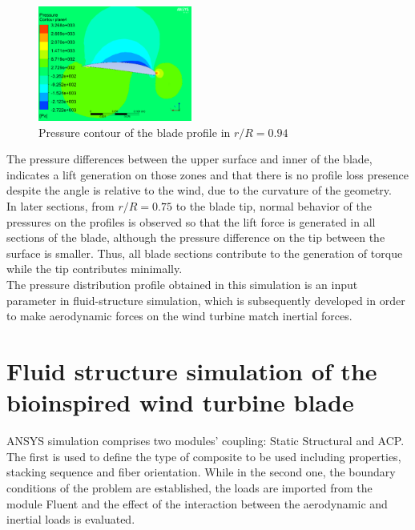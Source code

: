 \begin{figure}[H]
\begin{center}
  \includegraphics[width=0.45\textwidth]{fig4}
\caption{Pressure contour of the blade profile in $r/R=0.94$}
\label{fig:7}       %
\end{center}
\end{figure}

The pressure differences between the upper surface and inner of the blade, indicates a lift generation on those zones and that there is no profile loss presence despite the angle is relative to the wind, due to the curvature of the geometry.\\

In later sections, from $r / R = 0.75$ to the blade tip, normal behavior of the pressures on the profiles is observed so that the lift force is generated in all sections of the blade, although the pressure difference on the tip between the surface is smaller. Thus, all blade sections contribute to the generation of torque while the tip contributes minimally.\\

The pressure distribution profile obtained in this simulation is an input parameter in fluid-structure simulation, which is subsequently developed in order to make aerodynamic forces on the wind turbine match inertial forces.

\section{Fluid structure simulation of the bioinspired wind turbine blade}
\label{sec:5}

ANSYS  simulation comprises two modules’ coupling: Static Structural and ACP. The first is used to define the type of composite to be used including properties, stacking sequence and fiber orientation. While in the second one, the boundary conditions of the problem are established, the loads are imported from the module Fluent and the effect of the interaction between the aerodynamic and inertial loads is evaluated.\\

